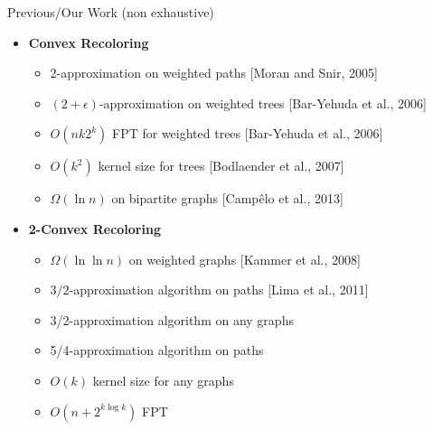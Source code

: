 \def\refsize{\tiny}

\begin{frame}{Previous/\alert{Our} Work (non exhaustive)}
\begin{itemize}
\item
\textbf{Convex Recoloring}
\begin{itemize}

\pause\item
$2$-approximation on weighted paths 
{\refsize[Moran and Snir, 2005]}

\pause\item
$(2 + \epsilon)$-approximation on weighted trees 
{\refsize[Bar-Yehuda et al., 2006]}

\pause\item
$O(n k 2^{k})$ FPT for weighted trees
{\refsize[Bar-Yehuda et al., 2006]}

\pause\item
$O(k^2)$ kernel size for trees
{\refsize[Bodlaender et al., 2007]}

\pause\item
$\Omega(\ln{n})$ on bipartite graphs
{\refsize[Camp\^elo et al., 2013]}


\end{itemize}
\pause\item
\textbf{2-Convex Recoloring}
\begin{itemize}


\pause\item
$\Omega(\ln\ln{n})$ on weighted graphs
{\refsize[Kammer et al., 2008]}

\pause\item
$3/2$-approximation algorithm on paths
{\refsize[Lima et al., 2011]}

\pause\item
\alert{3/2-approximation algorithm on any graphs}

\pause\item
\alert{5/4-approximation algorithm on paths}

\pause\item
\alert{$O(k)$ kernel size for any graphs}

\pause\item
\alert{$O(n + 2^{k\log k})$ FPT}



\end{itemize}
\end{itemize}
\end{frame}